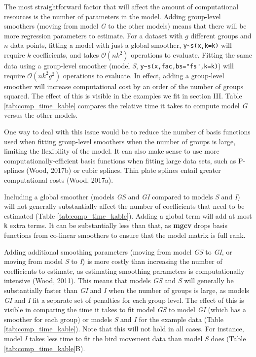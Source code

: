 \documentclass[12pt]{article}
\begin{document}
The most straightforward factor that will affect the amount of
computational resources is the number of parameters in the model. Adding
group-level smoothers (moving from model \emph{G} to the other models)
means that there will be more regression parameters to estimate. For a
dataset with \(g\) different groups and \(n\) data points, fitting a
model with just a global smoother, \texttt{y\textasciitilde{}s(x,k=k)}
will require \(k\) coefficients, and takes \(\mathcal{O}(nk^2)\)
operations to evaluate. Fitting the same data using a group-level
smoother (model \emph{S},
\texttt{y\textasciitilde{}s(x,fac,bs="fs",k=k)}) will require
\(\mathcal{O}(nk^2g^2)\) operations to evaluate. In effect, adding a
group-level smoother will increase computational cost by an order of the
number of groups squared. The effect of this is visible in the examples
we fit in section III. Table \ref{tab:comp_time_kable} compares the
relative time it takes to compute model \emph{G} versus the other
models.

One way to deal with this issue would be to reduce the number of basis
functions used when fitting group-level smoothers when the number of
groups is large, limiting the flexibility of the model. It can also make
sense to use more computationally-efficient basis functions when fitting
large data sets, such as P-splines (Wood, 2017b) or cubic splines. Thin
plate splines entail greater computational costs (Wood, 2017a).

Including a global smoother (models \emph{GS} and \emph{GI} compared to
models \emph{S} and \emph{I}) will not generally substantially affect
the number of coefficients that need to be estimated (Table
\ref{tab:comp_time_kable}). Adding a global term will add at most
\texttt{k} extra terms. It can be substantially less than that, as
\textbf{mgcv} drops basis functions from co-linear smoothers to ensure
that the model matrix is full rank.

Adding additional smoothing parameters (moving from model \emph{GS} to
\emph{GI}, or moving from model \emph{S} to \emph{I}) is more costly
than increasing the number of coefficients to estimate, as estimating
smoothing parameters is computationally intensive (Wood, 2011). This
means that models \emph{GS} and \emph{S} will generally be substantially
faster than \emph{GI} and \emph{I} when the number of groups is large,
as models \emph{GI} and \emph{I} fit a separate set of penalties for
each group level. The effect of this is visible in comparing the time it
takes to fit model \emph{GS} to model \emph{GI} (which has a smoother
for each group) or models \emph{S} and \emph{I} for the example data
(Table \ref{tab:comp_time_kable}). Note that this will not hold in all
cases. For instance, model \emph{I} takes less time to fit the bird
movement data than model \emph{S} does (Table
\ref{tab:comp_time_kable}B).
\end{document}
